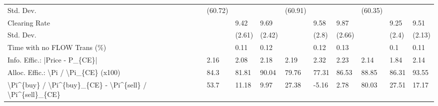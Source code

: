 \begin{tabular}{llllllllll}
 Std. Dev.                                                 & (60.72)  &          &          & (60.91)  &          &          & (60.35)   &           &           \\
 Clearing Rate                                             &          & 9.42     & 9.69     &          & 9.58     & 9.87     &           & 9.25      & 9.51      \\
 Std. Dev.                                                 &          & (2.61)   & (2.42)   &          & (2.8)    & (2.66)   &           & (2.4)     & (2.13)    \\
 Time with no FLOW Trans (\%)                               &          & 0.11     & 0.12     &          & 0.12     & 0.13     &           & 0.1       & 0.11      \\
 Info. Effic.: |Price - P\_\{CE\}|                            & 2.16     & 2.08     & 2.18     & 2.19     & 2.32     & 2.23     & 2.14      & 1.84      & 2.14      \\
 Alloc. Effic.: \textbackslash{}Pi / \textbackslash{}Pi\_\{CE\} (x100)                      & 84.3     & 81.81    & 90.04    & 79.76    & 77.31    & 86.53    & 88.85     & 86.31     & 93.55     \\
 \textbackslash{}Pi\^{}\{buy\} / \textbackslash{}Pi\^{}\{buy\}\_\{CE\} - \textbackslash{}Pi\^{}\{sell\} / \textbackslash{}Pi\^{}\{sell\}\_\{CE\} & 53.7     & 11.18    & 9.97     & 27.38    & -5.16    & 2.78     & 80.03     & 27.51     & 17.17     \\
\hline
\end{tabular}